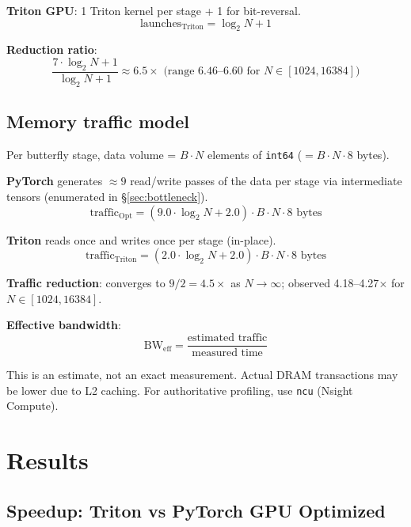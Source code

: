 \documentclass[11pt,a4paper]{article}
\begin{document}
\textbf{Triton GPU}: 1 Triton kernel per stage + 1 for bit-reversal.
\[
  \text{launches}_{\text{Triton}} = \log_2 N + 1
\]

\textbf{Reduction ratio}:
\[
  \frac{7 \cdot \log_2 N + 1}{\log_2 N + 1} \approx 6.5 \times \text{ (range 6.46--6.60 for } N \in [1024, 16384]\text{)}
\]

\subsection{Memory traffic model}

Per butterfly stage, data volume = $B \cdot N$ elements of \texttt{int64} ($= B \cdot N \cdot 8$ bytes).

\textbf{PyTorch} generates $\approx 9$ read/write passes of the data per stage via
intermediate tensors (enumerated in §\ref{sec:bottleneck}).
\[
  \text{traffic}_{\text{Opt}} = (9.0 \cdot \log_2 N + 2.0) \cdot B \cdot N \cdot 8 \text{ bytes}
\]

\textbf{Triton} reads once and writes once per stage (in-place).
\[
  \text{traffic}_{\text{Triton}} = (2.0 \cdot \log_2 N + 2.0) \cdot B \cdot N \cdot 8 \text{ bytes}
\]

\textbf{Traffic reduction}: converges to $9/2 = 4.5\times$ as $N \to \infty$; observed
4.18--4.27$\times$ for $N \in [1024, 16384]$.

\textbf{Effective bandwidth}:
\[
  \text{BW}_{\text{eff}} = \frac{\text{estimated traffic}}{\text{measured time}}
\]

This is an estimate, not an exact measurement. Actual DRAM transactions may be lower
due to L2 caching. For authoritative profiling, use \texttt{ncu} (Nsight Compute).

\section{Results}
\label{sec:results}

\subsection{Speedup: Triton vs PyTorch GPU Optimized}
\end{document}
